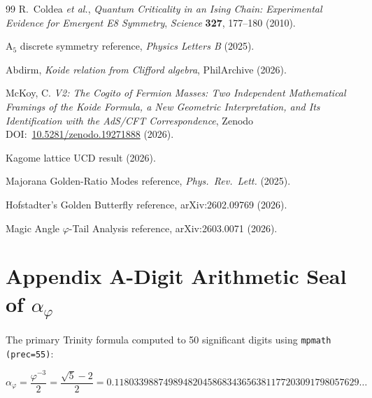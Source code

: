 \documentclass[10pt,a4paper]{article}
\begin{document}
\begin{thebibliography}{99}
R.~Coldea \textit{et al.},
\textit{Quantum Criticality in an Ising Chain: Experimental Evidence for Emergent E8 Symmetry},
\textit{Science} \textbf{327}, 177--180 (2010).

A$_5$ discrete symmetry reference,
\textit{Physics Letters B} (2025).

Abdirm,
\textit{Koide relation from Clifford algebra},
PhilArchive (2026).

McKoy, C.
\textit{V2: The Cogito of Fermion Masses: Two Independent Mathematical Framings of the Koide Formula, a New Geometric Interpretation, and Its Identification with the AdS/CFT Correspondence},
Zenodo DOI:~\href{https://doi.org/10.5281/zenodo.19271888}{10.5281/zenodo.19271888} (2026).

Kagome lattice UCD result (2026).

Majorana Golden-Ratio Modes reference,
\textit{Phys.\ Rev.\ Lett.} (2025).

Hofstadter's Golden Butterfly reference,
arXiv:2602.09769 (2026).

Magic Angle $\varphi$-Tail Analysis reference,
arXiv:2603.0071 (2026).

\end{thebibliography}

\appendix
\section*{Appendix A-Digit Arithmetic Seal of $\alpha_\varphi$}

The primary Trinity formula computed to 50 significant digits using \texttt{mpmath (prec=55)}:

\begin{equation}
  \alpha_\varphi = \frac{\varphi^{-3}}{2} = \frac{\sqrt{5} - 2}{2}
  = 0.11803398874989482045868343656381177203091798057629\ldots
  \label{eq:seal}
\end{equation}
\end{document}
